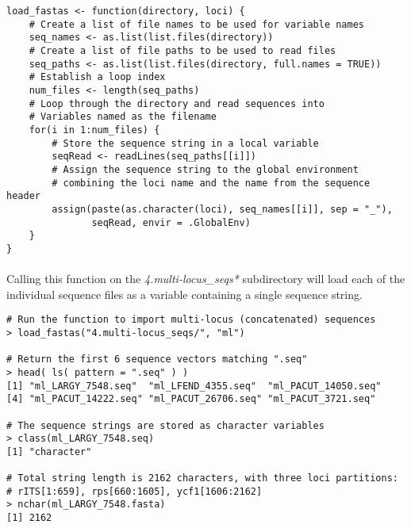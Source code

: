 \vspace*{30pt}

\begin{lstlisting}[caption={Contents of the \textbf{load\_fastas} function}]
load_fastas <- function(directory, loci) {
    # Create a list of file names to be used for variable names
    seq_names <- as.list(list.files(directory))
    # Create a list of file paths to be used to read files
    seq_paths <- as.list(list.files(directory, full.names = TRUE))
    # Establish a loop index
    num_files <- length(seq_paths)
    # Loop through the directory and read sequences into
    # Variables named as the filename
    for(i in 1:num_files) {
        # Store the sequence string in a local variable
        seqRead <- readLines(seq_paths[[i]])
        # Assign the sequence string to the global environment
        # combining the loci name and the name from the sequence header
        assign(paste(as.character(loci), seq_names[[i]], sep = "_"),
               seqRead, envir = .GlobalEnv)
    }
}
\end{lstlisting}

\clearpage

\paragraph{} Calling this function on the \textit{4.multi-locus\_seqs*} subdirectory will load each of the individual sequence files as a variable containing a single sequence string.

\vspace*{30pt}

\begin{lstlisting}[caption=Source sequence data into R workspace]
# Run the function to import multi-locus (concatenated) sequences
> load_fastas("4.multi-locus_seqs/", "ml")

# Return the first 6 sequence vectors matching ".seq"
> head( ls( pattern = ".seq" ) )
[1] "ml_LARGY_7548.seq"  "ml_LFEND_4355.seq"  "ml_PACUT_14050.seq"
[4] "ml_PACUT_14222.seq" "ml_PACUT_26706.seq" "ml_PACUT_3721.seq" 

# The sequence strings are stored as character variables
> class(ml_LARGY_7548.seq)
[1] "character"

# Total string length is 2162 characters, with three loci partitions:
# rITS[1:659], rps[660:1605], ycf1[1606:2162]
> nchar(ml_LARGY_7548.fasta)
[1] 2162
\end{lstlisting}

\vspace*{30pt}

